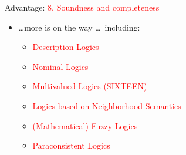 \documentclass[9pt,mathserif,unknownkeysallowed,xcolor=dvipsnames]{beamer}
\begin{document}
\begin{frame}[t]{Advantage: \textcolor{red}{8. Soundness and completeness}}
\begin{itemize}

\item \ldots more is on the way \ldots\ including: 
\begin{itemize}
   \item \textcolor{red}{Description Logics}
   \item \textcolor{red}{Nominal Logics}
   \item \textcolor{red}{Multivalued Logics (SIXTEEN)}
   \item \textcolor{red}{Logics based on Neighborhood Semantics}
   \item \textcolor{red}{(Mathematical) Fuzzy Logics}
   \item \textcolor{red}{Paraconsistent Logics}
\end{itemize}
\end{itemize}
\end{frame}
\end{document}

